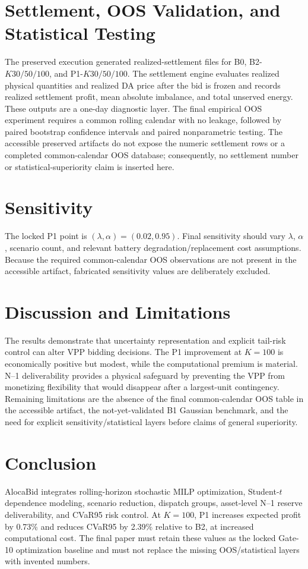 \documentclass[journal]{IEEEtran}
\begin{document}
\section{Settlement, OOS Validation, and Statistical Testing}
The preserved execution generated realized-settlement files for B0, B2-$K30/50/100$, and P1-$K30/50/100$. The settlement engine evaluates realized physical quantities and realized DA price after the bid is frozen and records realized settlement profit, mean absolute imbalance, and total unserved energy. These outputs are a one-day diagnostic layer. The final empirical OOS experiment requires a common rolling calendar with no leakage, followed by paired bootstrap confidence intervals and paired nonparametric testing. The accessible preserved artifacts do not expose the numeric settlement rows or a completed common-calendar OOS database; consequently, no settlement number or statistical-superiority claim is inserted here.

\section{Sensitivity}
The locked P1 point is $(\lambda,\alpha)=(0.02,0.95)$. Final sensitivity should vary $\lambda$, $\alpha$, scenario count, and relevant battery degradation/replacement cost assumptions. Because the required common-calendar OOS observations are not present in the accessible artifact, fabricated sensitivity values are deliberately excluded.

\section{Discussion and Limitations}
The results demonstrate that uncertainty representation and explicit tail-risk control can alter VPP bidding decisions. The P1 improvement at $K=100$ is economically positive but modest, while the computational premium is material. N--1 deliverability provides a physical safeguard by preventing the VPP from monetizing flexibility that would disappear after a largest-unit contingency. Remaining limitations are the absence of the final common-calendar OOS table in the accessible artifact, the not-yet-validated B1 Gaussian benchmark, and the need for explicit sensitivity/statistical layers before claims of general superiority.

\section{Conclusion}
AlocaBid integrates rolling-horizon stochastic MILP optimization, Student-$t$ dependence modeling, scenario reduction, dispatch groups, asset-level N--1 reserve deliverability, and CVaR95 risk control. At $K=100$, P1 increases expected profit by 0.73\% and reduces CVaR95 by 2.39\% relative to B2, at increased computational cost. The final paper must retain these values as the locked Gate-10 optimization baseline and must not replace the missing OOS/statistical layers with invented numbers.
\end{document}
